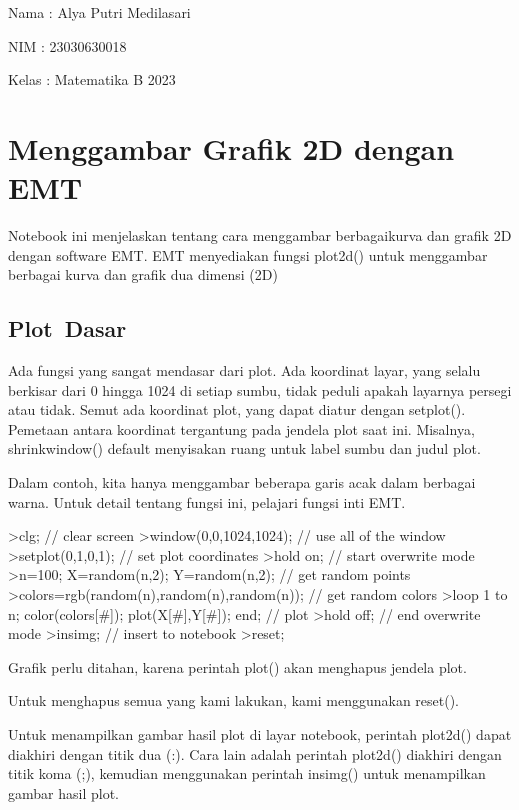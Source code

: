 \documentclass[
]{book}
\author{}
\date{}
\begin{document}
\frontmatter

\mainmatter
Nama : Alya Putri Medilasari

NIM : 23030630018

Kelas : Matematika B 2023

\chapter{Menggambar Grafik 2D dengan EMT}\label{menggambar-grafik-2d-dengan-emt}

Notebook ini menjelaskan tentang cara menggambar berbagaikurva dan grafik 2D dengan software EMT. EMT menyediakan fungsi plot2d() untuk menggambar berbagai kurva dan grafik dua dimensi (2D)

\section{Plot~Dasar}\label{plot-dasar}

Ada fungsi yang sangat mendasar dari plot. Ada koordinat layar, yang selalu berkisar dari 0 hingga 1024 di setiap sumbu, tidak peduli apakah layarnya persegi atau tidak. Semut ada koordinat plot, yang dapat diatur dengan setplot(). Pemetaan antara koordinat tergantung pada jendela plot saat ini. Misalnya, shrinkwindow() default menyisakan ruang untuk label sumbu dan judul plot.

Dalam contoh, kita hanya menggambar beberapa garis acak dalam berbagai warna. Untuk detail tentang fungsi ini, pelajari fungsi inti EMT.

\textgreater clg; // clear screen \textgreater window(0,0,1024,1024); // use all of the window \textgreater setplot(0,1,0,1); // set plot coordinates \textgreater hold on; // start overwrite mode \textgreater n=100; X=random(n,2); Y=random(n,2); // get random points \textgreater colors=rgb(random(n),random(n),random(n)); // get random colors \textgreater loop 1 to n; color(colors{[}\#{]}); plot(X{[}\#{]},Y{[}\#{]}); end; // plot \textgreater hold off; // end overwrite mode \textgreater insimg; // insert to notebook \textgreater reset;

Grafik perlu ditahan, karena perintah plot() akan menghapus jendela plot.

Untuk menghapus semua yang kami lakukan, kami menggunakan reset().

Untuk menampilkan gambar hasil plot di layar notebook, perintah plot2d() dapat diakhiri dengan titik dua (:). Cara lain adalah perintah plot2d() diakhiri dengan titik koma (;), kemudian menggunakan perintah insimg() untuk menampilkan gambar hasil plot.
\end{document}
